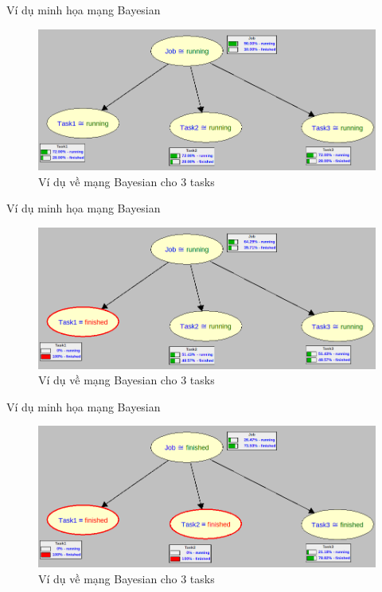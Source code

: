 \documentclass[11pt,xcolor={dvipsnames}, aspectratio=169]{beamer}
\begin{document}
\begin{frame}
{Ví dụ minh họa mạng Bayesian}
	\begin{figure}
		\centering
		\includegraphics[scale=0.4]{images/bayesian_network_ex1.png}
		\caption{Ví dụ về mạng Bayesian cho 3 tasks}
	\end{figure}
\end{frame}

\begin{frame}
{Ví dụ minh họa mạng Bayesian}
	\begin{figure}
		\centering
		\includegraphics[scale=0.4]{images/bayesian_network_ex2.png}
		\caption{Ví dụ về mạng Bayesian cho 3 tasks}
	\end{figure}
\end{frame}

\begin{frame}
{Ví dụ minh họa mạng Bayesian}
	\begin{figure}
		\centering
		\includegraphics[scale=0.4]{images/bayesian_network_ex3.png}
		\caption{Ví dụ về mạng Bayesian cho 3 tasks}
	\end{figure}
\end{frame}
\end{document}
